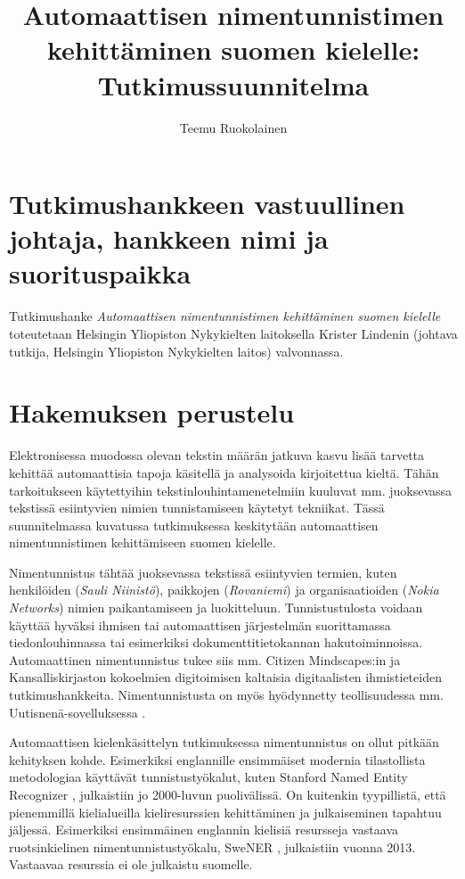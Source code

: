 \documentclass[12pt,a4paper,finnish,oneside]{article}
\begin{document}
\title{Automaattisen nimentunnistimen kehittäminen suomen kielelle: Tutkimussuunnitelma}
\author{Teemu Ruokolainen}


\maketitle


\section{Tutkimushankkeen vastuullinen johtaja, hankkeen nimi ja suorituspaikka}

Tutkimushanke \textit{Automaattisen nimentunnistimen kehittäminen suomen kielelle}  toteutetaan Helsingin Yliopiston Nykykielten laitoksella Krister Lindenin (johtava tutkija, Helsingin Yliopiston Nykykielten laitos) valvonnassa. %

\section{Hakemuksen perustelu}

Elektronisessa muodossa olevan tekstin määrän jatkuva kasvu lisää tarvetta kehittää automaattisia tapoja käsitellä ja analysoida kirjoitettua kieltä. Tähän tarkoitukseen käytettyihin tekstinlouhintamenetelmiin kuuluvat mm. juoksevassa tekstissä esiintyvien nimien tunnistamiseen käytetyt tekniikat. Tässä suunnitelmassa kuvatussa tutkimuksessa keskitytään automaattisen nimentunnistimen kehittämiseen suomen kielelle. 

Nimentunnistus tähtää juoksevassa tekstissä esiintyvien termien, kuten henkilöiden (\textit{Sauli Niinistö}), paikkojen (\textit{Rovaniemi}) ja organisaatioiden (\textit{Nokia Networks}) nimien paikantamiseen ja luokitteluun. Tunnistustulosta voidaan käyttää hyväksi ihmisen tai automaattisen järjestelmän suorittamassa tiedonlouhinnassa tai esimerkiksi dokumenttitietokannan hakutoiminnoissa. Automaattinen nimentunnistus tukee siis mm. Citizen Mindscapes:in \cite{citizenmindscapes} ja Kansalliskirjaston kokoelmien digitoimisen \cite{kansalliskirjasto} kaltaisia digitaalisten ihmistieteiden tutkimushankkeita. Nimentunnistusta on myös hyödynnetty teollisuudessa mm. Uutisnenä-sovelluksessa \cite{huovelin2013}.

Automaattisen kielenkäsittelyn tutkimuksessa nimentunnistus on ollut pitkään kehityksen kohde. Esimerkiksi englannille ensimmäiset modernia tilastollista metodologiaa käyttävät tunnistustyökalut, kuten Stanford Named Entity Recognizer \cite{stanfordner}, julkaistiin jo 2000-luvun puolivälissä. On kuitenkin tyypillistä, että pienemmillä kielialueilla kieliresurssien kehittäminen ja julkaiseminen tapahtuu jäljessä. Esimerkiksi ensimmäinen englannin kielisiä resursseja vastaava ruotsinkielinen nimentunnistustyökalu, SweNER \cite{ostling2013}, julkaistiin vuonna 2013. Vastaavaa resurssia ei ole julkaistu suomelle.
\end{document}
